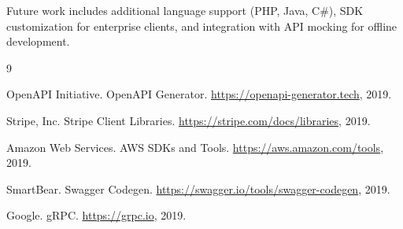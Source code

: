 \documentclass[11pt,a4paper]{article}
\begin{document}
Future work includes additional language support (PHP, Java, C\#), SDK customization for enterprise clients, and integration with API mocking for offline development.


\begin{thebibliography}{9}

OpenAPI Initiative. OpenAPI Generator. \url{https://openapi-generator.tech}, 2019.

Stripe, Inc. Stripe Client Libraries. \url{https://stripe.com/docs/libraries}, 2019.

Amazon Web Services. AWS SDKs and Tools. \url{https://aws.amazon.com/tools}, 2019.

SmartBear. Swagger Codegen. \url{https://swagger.io/tools/swagger-codegen}, 2019.

Google. gRPC. \url{https://grpc.io}, 2019.

\end{thebibliography}
\end{document}
